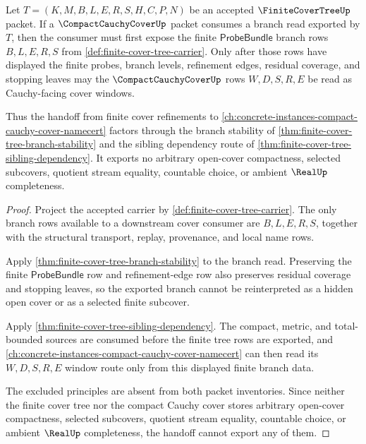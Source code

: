 \begin{theorem}
\label{thm:finite-cover-tree-compact-cauchy-cover-handoff}
Let $T=(K,M,B,L,E,R,S,H,C,P,N)$ be an accepted $\FiniteCoverTreeUp$ packet. If a $\CompactCauchyCoverUp$ packet consumes a branch read exported by $T$, then the consumer must first expose the finite $\mathsf{ProbeBundle}$ branch rows $B,L,E,R,S$ from \autoref{def:finite-cover-tree-carrier}. Only after those rows have displayed the finite probes, branch levels, refinement edges, residual coverage, and stopping leaves may the $\CompactCauchyCoverUp$ rows $W,D,S,R,E$ be read as Cauchy-facing cover windows.

Thus the handoff from finite cover refinements to \autoref{ch:concrete-instances-compact-cauchy-cover-namecert} factors through the branch stability of \autoref{thm:finite-cover-tree-branch-stability} and the sibling dependency route of \autoref{thm:finite-cover-tree-sibling-dependency}. It exports no arbitrary open-cover compactness, selected subcovers, quotient stream equality, countable choice, or ambient $\RealUp$ completeness.
\end{theorem}
\begin{proof}
Project the accepted carrier by \autoref{def:finite-cover-tree-carrier}. The only branch rows available to a downstream cover consumer are $B,L,E,R,S$, together with the structural transport, replay, provenance, and local name rows.

Apply \autoref{thm:finite-cover-tree-branch-stability} to the branch read. Preserving the finite $\mathsf{ProbeBundle}$ row and refinement-edge row also preserves residual coverage and stopping leaves, so the exported branch cannot be reinterpreted as a hidden open cover or as a selected finite subcover.

Apply \autoref{thm:finite-cover-tree-sibling-dependency}. The compact, metric, and total-bounded sources are consumed before the finite tree rows are exported, and \autoref{ch:concrete-instances-compact-cauchy-cover-namecert} can then read its $W,D,S,R,E$ window route only from this displayed finite branch data.

The excluded principles are absent from both packet inventories. Since neither the finite cover tree nor the compact Cauchy cover stores arbitrary open-cover compactness, selected subcovers, quotient stream equality, countable choice, or ambient $\RealUp$ completeness, the handoff cannot export any of them.
\end{proof}


